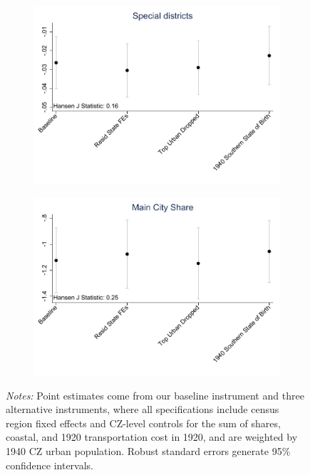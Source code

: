 \documentclass{article}
\begin{document}
\begin{landscape}
\begin{figure}[htbp]
\begin{subfigure}{0.4\textwidth}
        \includegraphics[width=\linewidth]{figures/exogeneity_tests/D16_alt_inst_pooled_spdist_new_ctrls.pdf}
        \label{fig:sub5}
    \end{subfigure}
    \begin{subfigure}{0.4\textwidth}
        \includegraphics[width=\linewidth]{figures/exogeneity_tests/D16_alt_inst_pooled_totfrac_new_ctrls.pdf}
        \label{fig:sub6}
    \end{subfigure}
    \label{fig:alt_inst}
    \caption*{\scriptsize \emph{Notes:} Point estimates come from our baseline instrument and three alternative instruments, where all specifications include census region fixed effects and CZ-level controls for the sum of shares, coastal, and 1920 transportation cost in 1920, and are weighted by 1940 CZ urban population. Robust standard errors generate 95\% confidence intervals.} 
\end{figure}


\end{landscape}
\end{document}
